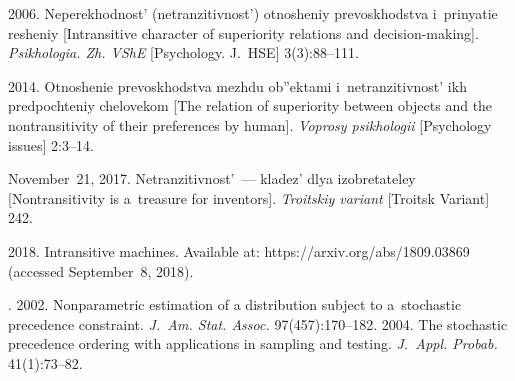 





\vspace*{6pt}

  \begin{multicols}{2}

\renewcommand{\bibname}{\protect\rmfamily References}

{\small\frenchspacing
 {%
 \begin{thebibliography}{99}
 
 \vspace*{-2pt}
 
2006. Neperekhodnost' (netranzitivnost') otnosheniy prevoskhodstva
i~prinyatie re\-she\-niy [Intransitive character of superiority relations 
and decision-making].
\textit{Psikhologia. Zh. VShE} [Psychology. J.~HSE] 3(3):88--111.

2014. Otnoshenie prevoskhodstva mezhdu
ob''ektami i~netranzitivnost' ikh predpochteniy chelovekom 
[The relation of superiority between objects and the nontransitivity of 
their preferences by human]. \textit{Voprosy psikhologii} [Psychology issues]
 2:3--14.
 
 November~21, 2017. Netranzitivnost'~--- kladez' dlya izobretateley 
[Nontransitivity is a~treasure for inventors]. 
\textit{Troitskiy variant} [Troitsk Variant]  242.

 2018. Intransitive machines. 
Available at: {\sf https://arxiv.org/abs/1809.03869}
(accessed September~8, 2018).


. 
2002. Nonparametric estimation of a
distribution subject to a~stochastic precedence constraint. 
\textit{J.~Am. Stat. Assoc.} 97(457):170--182.
 2004. 
The stochastic precedence ordering with applications
in sampling and testing. \textit{J.~Appl. Probab.} 41(1):73--82.


\end{thebibliography}}}
\end{multicols}
